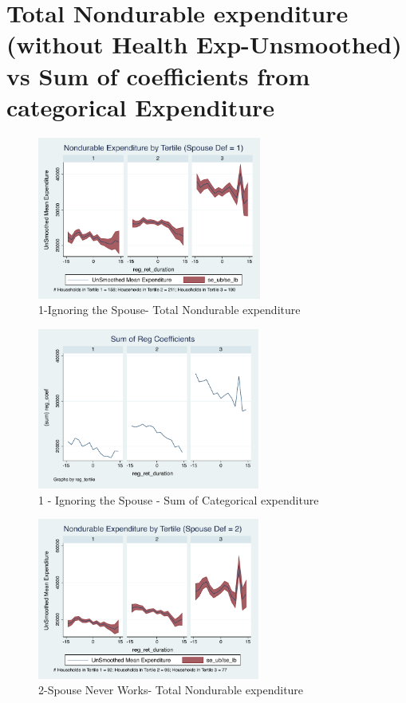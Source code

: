 \documentclass[11pt,onecolumn]{article}
\numberwithin{figure}{section}
\begin{document}
\clearpage

\section{Total Nondurable expenditure (without Health Exp-Unsmoothed) vs Sum of coefficients from categorical Expenditure}

\begin{figure}[h]
	\caption{1-Ignoring the Spouse- Total Nondurable expenditure}
	\centering
	\includegraphics[width=0.655\textwidth]{../ConsumptionPostRetirement_by_SpouseDef/UnSmoothed/spouse_def_1.pdf}
\end{figure}
\clearpage

\begin{figure}
	\caption{1 - Ignoring the Spouse - Sum of Categorical expenditure}
	\centering
	\includegraphics[width=0.65\textwidth]{../ConsumptionPostRetirement_by_SpouseDef_Cats/SumCoef/spouse_def_1.pdf}
\end{figure}

\begin{figure}[h]
	\caption{2-Spouse Never Works- Total Nondurable expenditure}
	\centering
	\includegraphics[width=0.65\textwidth]{../ConsumptionPostRetirement_by_SpouseDef/UnSmoothed/spouse_def_2.pdf}
\end{figure}
\end{document}

